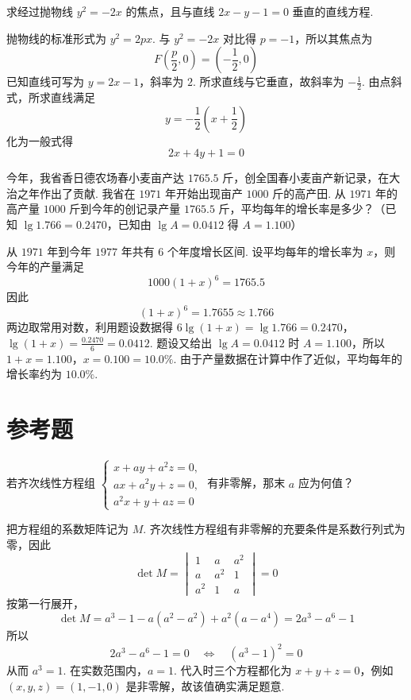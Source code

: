 \begin{problem}
求经过抛物线 \( y^2=-2x \) 的焦点，且与直线 \( 2x-y-1=0 \) 垂直的直线方程.
\end{problem}

\begin{solution}
抛物线的标准形式为 \(y^2=2px\). 与 \(y^2=-2x\) 对比得 \(p=-1\)，所以其焦点为
\[
F\left(\frac{p}{2},0\right)=\left(-\frac{1}{2},0\right)
\]
已知直线可写为 \(y=2x-1\)，斜率为 \(2\). 所求直线与它垂直，故斜率为 \(-\frac{1}{2}\). 由点斜式，所求直线满足
\[
y=-\frac{1}{2}\left(x+\frac{1}{2}\right)
\]
化为一般式得
\[
2x+4y+1=0
\]
\end{solution}

\begin{problem}
今年，我省香日德农场春小麦亩产达 \( 1765.5 \) 斤，创全国春小麦亩产新记录，在大治之年作出了贡献. 我省在 \( 1971 \) 年开始出现亩产 \( 1000 \) 斤的高产田. 从 \( 1971 \) 年的高产量 \( 1000 \) 斤到今年的创记录产量 \( 1765.5 \) 斤，平均每年的增长率是多少？（已知 \(\lg1.766=0.2470\)，已知由 \(\lg A=0.0412\) 得 \(A=1.100\)）
\end{problem}

\begin{solution}
从 \(1971\) 年到今年 \(1977\) 年共有 \(6\) 个年度增长区间. 设平均每年的增长率为 \(x\)，则今年的产量满足
\[
1000(1+x)^6=1765.5
\]
因此
\[
(1+x)^6=1.7655\approx1.766
\]
两边取常用对数，利用题设数据得
\(6\lg(1+x)=\lg1.766=0.2470\)，\(\lg(1+x)=\frac{0.2470}{6}=0.0412\).
题设又给出 \(\lg A=0.0412\) 时 \(A=1.100\)，所以
\(1+x=1.100\)，\(x=0.100=10.0\%\).
由于产量数据在计算中作了近似，平均每年的增长率约为 \(10.0\%\).
\end{solution}

\section{参考题}

\begin{problem}
若齐次线性方程组
\(\begin{cases}
x+ay+a^2z=0,\\
ax+a^2y+z=0,\\
a^2x+y+az=0
\end{cases}\)
有非零解，那末 \(a\) 应为何值？
\end{problem}

\begin{solution}
把方程组的系数矩阵记为 \(M\). 齐次线性方程组有非零解的充要条件是系数行列式为零，因此
\[
\det M=
\begin{vmatrix}
1&a&a^2\\
a&a^2&1\\
a^2&1&a
\end{vmatrix}=0
\]
按第一行展开，
\[
\det M
=a^3-1-a\left(a^2-a^2\right)+a^2\left(a-a^4\right)
=2a^3-a^6-1
\]
所以
\[
2a^3-a^6-1=0
\quad\Longleftrightarrow\quad
\left(a^3-1\right)^2=0
\]
从而 \(a^3=1\). 在实数范围内，\(a=1\). 代入时三个方程都化为 \(x+y+z=0\)，例如 \((x,y,z)=(1,-1,0)\) 是非零解，故该值确实满足题意.
\end{solution}

